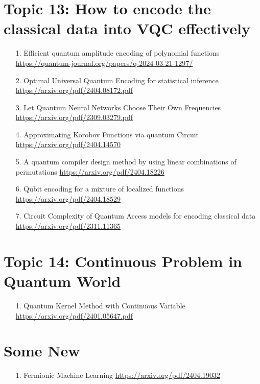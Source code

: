 \documentclass[12pt, oneside]{article}   	%
\begin{document}
\section{Topic 13: How to encode the classical data into VQC effectively}
\begin{itemize}
\item[1. ] Efficient quantum amplitude encoding of polynomial functions \url{https://quantum-journal.org/papers/q-2024-03-21-1297/}
\item[2.] Optimal Universal Quantum Encoding for statistical inference \url{https://arxiv.org/pdf/2404.08172.pdf}
\item[3.] Let Quantum  Neural Networks Choose Their Own Frequencies \url{https://arxiv.org/pdf/2309.03279.pdf}
\item [4. ] Approximating Korobov Functions via quantum Circuit \url{https://arxiv.org/pdf/2404.14570}
\item [5. ] A quantum compiler design method by using linear combinations of permutations \url{https://arxiv.org/pdf/2404.18226}
\item [6. ] Qubit encoding for a mixture of localized functions \url{https://arxiv.org/pdf/2404.18529}
\item [7.] Circuit Complexity of Quantum Access models for encoding classical data \url{https://arxiv.org/pdf/2311.11365}
\end{itemize}
\section{Topic 14: Continuous Problem in Quantum World}
\begin{itemize}
\item[1. ] Quantum Kernel Method with Continuous Variable \url{https://arxiv.org/pdf/2401.05647.pdf}
\end{itemize}
\section*{Some New}
\begin{itemize}
	\item [1. ] Fermionic Machine Learning \url{https://arxiv.org/pdf/2404.19032}
\end{itemize}
\end{document}
